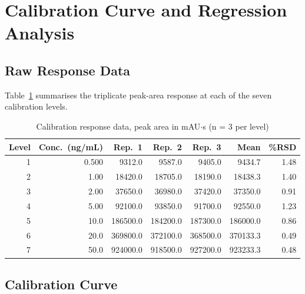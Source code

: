 
\section{Calibration Curve and Regression Analysis}

\subsection{Raw Response Data}
Table~\ref{tab:caldata} summarises the triplicate peak-area response at each of the
seven calibration levels.

\begin{table}[h!]
\centering
\small
\caption{Calibration response data, peak area in mAU$\cdot$s (n = 3 per level)}
\label{tab:caldata}
\begin{tabularx}{\linewidth}{@{}r r r r r r r@{}}
\toprule
\textbf{Level} & \textbf{Conc.\ (ng/mL)} & \textbf{Rep.\ 1} & \textbf{Rep.\ 2} & \textbf{Rep.\ 3} & \textbf{Mean} & \textbf{\%RSD} \\
\midrule
1 & 0.500 & 9312.0    & 9587.0    & 9405.0    & 9434.7    & 1.48 \\
2 & 1.00  & 18420.0   & 18705.0   & 18190.0   & 18438.3   & 1.40 \\
3 & 2.00  & 37650.0   & 36980.0   & 37420.0   & 37350.0   & 0.91 \\
4 & 5.00  & 92100.0   & 93850.0   & 91700.0   & 92550.0   & 1.23 \\
5 & 10.0  & 186500.0  & 184200.0  & 187300.0  & 186000.0  & 0.86 \\
6 & 20.0  & 369800.0  & 372100.0  & 368500.0  & 370133.3  & 0.49 \\
7 & 50.0  & 924000.0  & 918500.0  & 927200.0  & 923233.3  & 0.48 \\
\bottomrule
\end{tabularx}
\end{table}

\subsection{Calibration Curve}

